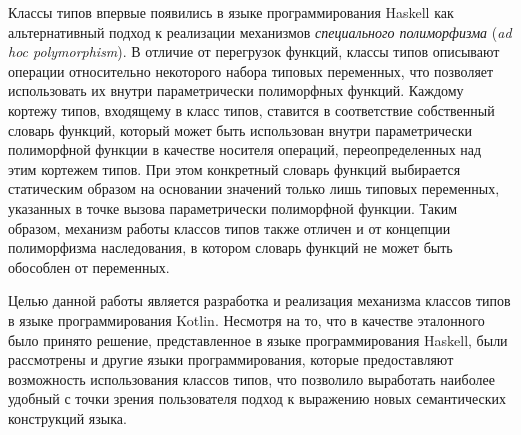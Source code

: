 \intro


Классы типов впервые появились в языке программирования Haskell как альтернативный подход к реализации механизмов \emph{специального полиморфизма} (\emph{ad hoc polymorphism}). В отличие от перегрузок функций, классы типов описывают операции относительно некоторого набора типовых переменных, что позволяет использовать их внутри параметрически полиморфных функций. Каждому кортежу типов, входящему в класс типов, ставится в соответствие собственный словарь функций, который может быть использован внутри параметрически полиморфной функции в качестве носителя операций, переопределенных над этим кортежем типов. При этом конкретный словарь функций выбирается статическим образом на основании значений только лишь типовых переменных, указанных в точке вызова параметрически полиморфной функции. Таким образом, механизм работы классов типов также отличен и от концепции полиморфизма наследования, в котором словарь функций не может быть обособлен от переменных. 


Целью данной работы является разработка и реализация механизма классов типов в языке программирования Kotlin. Несмотря на то, что в качестве эталонного было принято решение, представленное в языке программирования Haskell, были рассмотрены и другие языки программирования, которые предоставляют возможность использования классов типов, что позволило выработать наиболее удобный с точки зрения пользователя подход к выражению новых семантических конструкций языка. %

